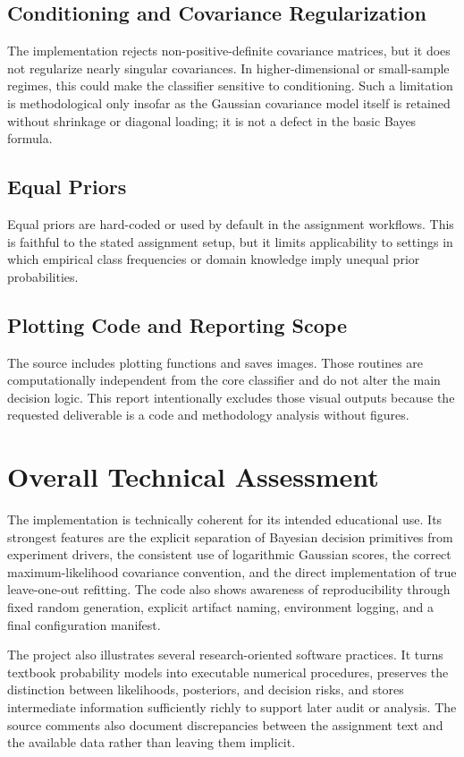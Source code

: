 \documentclass[11pt,a4paper]{article}
\begin{document}
\subsection{Conditioning and Covariance Regularization}
The implementation rejects non-positive-definite covariance matrices, but it does not regularize nearly singular covariances. In higher-dimensional or small-sample regimes, this could make the classifier sensitive to conditioning. Such a limitation is methodological only insofar as the Gaussian covariance model itself is retained without shrinkage or diagonal loading; it is not a defect in the basic Bayes formula.

\subsection{Equal Priors}
Equal priors are hard-coded or used by default in the assignment workflows. This is faithful to the stated assignment setup, but it limits applicability to settings in which empirical class frequencies or domain knowledge imply unequal prior probabilities.

\subsection{Plotting Code and Reporting Scope}
The source includes plotting functions and saves images. Those routines are computationally independent from the core classifier and do not alter the main decision logic. This report intentionally excludes those visual outputs because the requested deliverable is a code and methodology analysis without figures.

\section{Overall Technical Assessment}
The implementation is technically coherent for its intended educational use. Its strongest features are the explicit separation of Bayesian decision primitives from experiment drivers, the consistent use of logarithmic Gaussian scores, the correct maximum-likelihood covariance convention, and the direct implementation of true leave-one-out refitting. The code also shows awareness of reproducibility through fixed random generation, explicit artifact naming, environment logging, and a final configuration manifest.

The project also illustrates several research-oriented software practices. It turns textbook probability models into executable numerical procedures, preserves the distinction between likelihoods, posteriors, and decision risks, and stores intermediate information sufficiently richly to support later audit or analysis. The source comments also document discrepancies between the assignment text and the available data rather than leaving them implicit.
\end{document}
